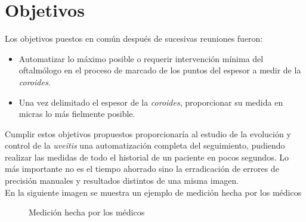 \section{Objetivos}
Los objetivos puestos en común después de sucesivas reuniones fueron:
\begin{itemize}
\item Automatizar lo máximo posible o requerir intervención mínima del
  oftalmólogo en el proceso de marcado de los puntos del espesor a
  medir de la \emph{\gls{coroides}}.
\item Una vez delimitado el espesor de la \emph{\gls{coroides}},
  proporcionar su medida en micras lo más fielmente posible.
\end{itemize}
Cumplir estos objetivos propuestos proporcionaría al estudio de la
evolución y control de la \emph{\gls{uveitis}} una automatización
completa del seguimiento, pudiendo realizar las medidas de todo el
historial de un paciente en pocos segundos. Lo más importante no es el
tiempo ahorrado sino la erradicación de errores de precisión manuales
y resultados distintos de una misma imagen.\\
En la siguiente imagen se muestra un ejemplo de medición hecha por los
médicos
\begin{figure}[H]
  \caption{Medición hecha por los médicos}
  \centering \setlength\fboxsep{0pt} \setlength\fboxrule{0.5pt}
\end{figure}

